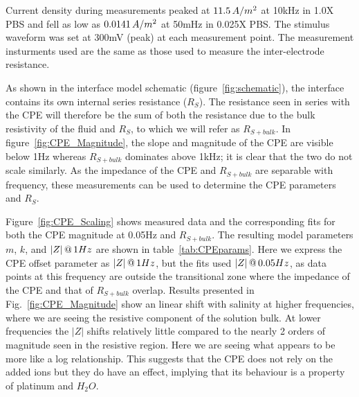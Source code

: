 \documentclass[journal, a4paper]{IEEEtran}
\begin{document}
{
    \color{blue}
Current density during measurements peaked at $11.5\thinspace A/m^{2}$ at 10\thinspace kHz in 1.0X PBS and fell as low as $0.0141\thinspace A/m^{2}$ at 50\thinspace mHz in 0.025X PBS. The stimulus waveform was set at 300\thinspace mV (peak) at each measurement point. The measurement insturments used are the same as those used to measure the inter-electrode resistance.
}
{
As shown in the interface model schematic (figure~\ref{fig:schematic}), the interface contains its own internal series resistance ($R_{S}$). The resistance seen in series with the CPE will therefore be the sum of both the resistance due to the bulk resistivity of the fluid and $R_{S}$, to which we will refer as $R_{S+bulk}$.
In figure~\ref{fig:CPE_Magnitude}, the slope and magnitude of the CPE are visible below 1\thinspace Hz whereas $R_{S+bulk}$  dominates above 1\thinspace kHz; it is clear that the two do not scale similarly.
As the impedance of the CPE and $R_{S+bulk}$ are separable with frequency, these measurements can be used to determine the CPE parameters and $R_{S}$.

Figure~\ref{fig:CPE_Scaling} shows measured data and the corresponding fits for both the CPE magnitude at 0.05\thinspace Hz and $R_{S+bulk}$. The resulting model parameters $m$, $k$, and $|Z|\thinspace @\thinspace 1Hz$ are shown in table~\ref{tab:CPEparams}. Here we express the CPE offset parameter as $|Z|\thinspace @ \thinspace 1Hz$, but the fits used $|Z|\thinspace @ \thinspace 0.05Hz$, as data points at this frequency are outside the transitional zone where the impedance of the CPE and that of $R_{S+bulk}$ overlap.
{
    \color{blue} Results presented in Fig.~\ref{fig:CPE_Magnitude} show an linear shift with salinity at higher frequencies, where we are seeing the resistive component of the solution bulk. At lower frequencies the $|Z|$ shifts relatively little compared to the nearly 2 orders of magnitude seen in the resistive region. Here we are seeing what appears to be more like a log relationship. 
}
This suggests that the CPE does not rely on the added ions but they do have an effect, implying that its behaviour is a property of platinum and $H_{2}O$.

}
\end{document}
